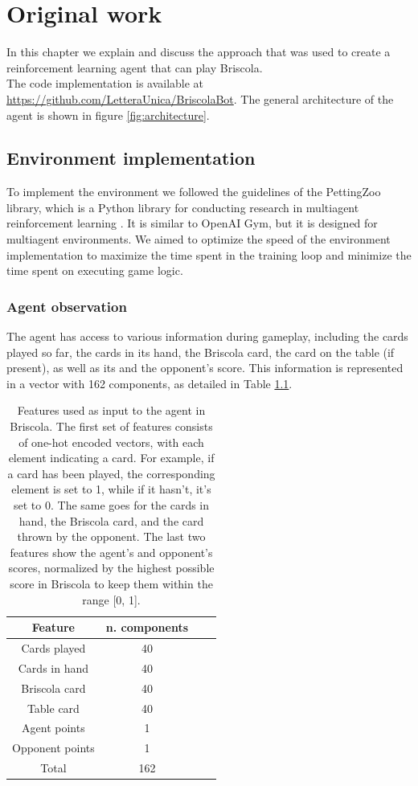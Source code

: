 \chapter{Original work}

In this chapter we explain and discuss the approach that was used to create a reinforcement learning agent that can play Briscola.\\
The code implementation is available at \url{https://github.com/LetteraUnica/BriscolaBot}.
The general architecture of the agent is shown in figure \ref{fig:architecture}.

\section{Environment implementation}
To implement the environment we followed the guidelines of the PettingZoo library, which is a Python library for conducting research in multiagent reinforcement learning \cite{pettingzoo}. It is similar to OpenAI Gym, but it is designed for multiagent environments. We aimed to optimize the speed of the environment implementation to maximize the time spent in the training loop and minimize the time spent on executing game logic.

\subsection{Agent observation}
The agent has access to various information during gameplay, including the cards played so far, the cards in its hand, the Briscola card, the card on the table (if present), as well as its and the opponent's score. This information is represented in a vector with 162 components, as detailed in Table \ref{tab:state}.

\begin{table}[H]
    \centering
    \begin{tabular}{c c c c} 
     \hline
     Feature & n. components \\
     \hline
        Cards played & 40 \\
        Cards in hand & 40 \\
        Briscola card & 40 \\
        Table card & 40 \\
        \hline
        Agent points & 1 \\
        Opponent points & 1 \\
        \hline
        Total & 162 \\
        \hline
    \end{tabular}

    \caption{Features used as input to the agent in Briscola. The first set of features consists of one-hot encoded vectors, with each element indicating a card. For example, if a card has been played, the corresponding element is set to 1, while if it hasn't, it's set to 0. The same goes for the cards in hand, the Briscola card, and the card thrown by the opponent. The last two features show the agent's and opponent's scores, normalized by the highest possible score in Briscola to keep them within the range [0, 1].}
    \label{tab:state}
\end{table}

